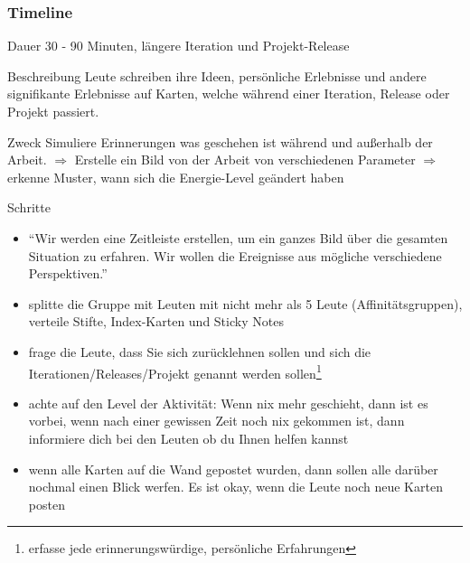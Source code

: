 \subsubsection{Timeline}
\begin{Beschreibungfett}[Beschreibung]
  \item [Dauer] 30 - 90 Minuten, längere Iteration und Projekt-Release
  \item [Beschreibung] Leute schreiben ihre Ideen, persönliche Erlebnisse und andere
    signifikante Erlebnisse auf Karten, welche während einer Iteration, Release oder Projekt
    passiert.
  \item [Zweck] Simuliere Erinnerungen was geschehen ist während und außerhalb der
    Arbeit. $\Rightarrow$  Erstelle ein Bild von der Arbeit von verschiedenen Parameter
  $\Rightarrow$  erkenne Muster, wann sich die Energie-Level geändert haben
  \item [Schritte]
    \begin{itemize}
      \item \enquote{Wir werden eine Zeitleiste erstellen, um ein ganzes Bild über die gesamten
        Situation zu erfahren. Wir wollen die Ereignisse aus mögliche verschiedene Perspektiven.}
      \item splitte die Gruppe mit Leuten mit nicht mehr als 5 Leute (Affinitätsgruppen),
        verteile Stifte, Index-Karten und Sticky Notes
      \item frage die Leute, dass Sie sich zurücklehnen sollen und sich die
        Iterationen/Releases/Projekt genannt werden sollen\footnote{erfasse jede erinnerungswürdige,
        persönliche Erfahrungen}
      \item achte auf den Level der Aktivität: Wenn nix mehr geschieht, dann ist es vorbei,
        wenn nach einer gewissen Zeit noch nix gekommen ist, dann informiere dich bei den
        Leuten ob du Ihnen helfen kannst
      \item wenn alle Karten auf die Wand gepostet wurden, dann sollen alle darüber nochmal
        einen Blick werfen. Es ist okay, wenn die Leute noch neue Karten posten
    \end{itemize}
\end{Beschreibungfett}


